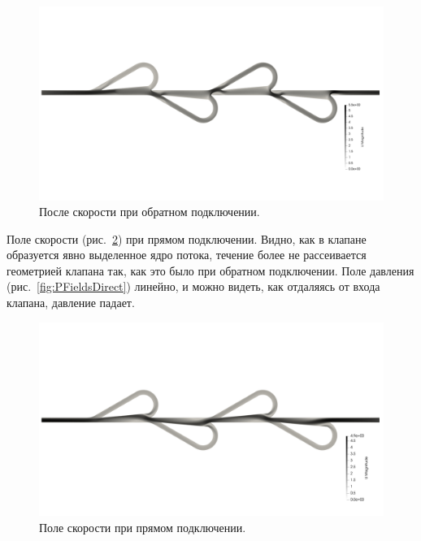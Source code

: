 \documentclass[10pt,a4paper]{book}
\begin{document}
        \begin{figure}[H]
            \centering
            \includegraphics[width = 1\linewidth]{UFieldsReverse}
            \caption{После скорости при обратном подключении.}
            \label{fig:UFieldsReverse}
        \end{figure}
        
        Поле скорости (рис.~\ref{fig:UFieldsDirect}) при прямом подключении. Видно, как в клапане образуется явно выделенное ядро потока, течение более не рассеивается геометрией клапана так, как это было при обратном подключении. Поле давления (рис.~\ref{fig:PFieldsDirect}) линейно, и можно видеть, как отдаляясь от входа клапана, давление падает.
        
        \begin{figure}[H]
            \centering
            \includegraphics[width = 1\linewidth]{UFieldsDirect}
            \caption{Поле скорости при прямом подключении.}
            \label{fig:UFieldsDirect}
        \end{figure}
        
\end{document}
